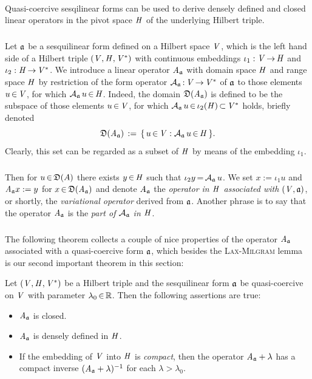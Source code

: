 \documentclass[11pt,twoside]{article}
\begin{document}
\paragraph*{} %
Quasi-coercive sesqilinear forms can be used
to derive densely defined and closed linear operators
in the pivot space $\mathit{H}$ of the underlying Hilbert triple.

\subparagraph*{}
Let $\mathfrak{a}$ be a sesquilinear form defined on a Hilbert space $\mathit{V}$,
which is the left hand side of a Hilbert triple $(\mathit{V},\mathit{H},\mathit{V}^*)$
with continuous embeddings
$\iota_1:\mathit{V} {\,\to\,} \mathit{H}$ and
$\iota_2:\mathit{H} {\,\to\,} \mathit{V}^*$.
We introduce a linear operator $\mathit{A}_{\mathfrak{a}}$ with domain space $\mathit{H}$
and range space $\mathit{H}$
by restriction of the form operator ${{\mathcal{A}}_{\mathfrak{a}}} {\,:\,} \mathit{V} {\,\to\,} \mathit{V}^*$ of $\mathfrak{a}$
to those elements $u {\,\in\,} \mathit{V}$,
for which ${{\mathcal{A}}_{\mathfrak{a}}} \, u {\,\in\,} \mathit{H}$.
Indeed,
the domain $\mathfrak{D}(\mathit{A}_{\mathfrak{a}})$ is defined to be the subspace
of those elements $u {\,\in\,} \mathit{V}$,
for which ${{\mathcal{A}}_{\mathfrak{a}}} \, u {\,\in\,} \iota_2(\mathit{H}) {\,\subset\,} \mathit{V}^*$ holds,
briefly denoted
\[
\mathfrak{D}(\mathit{A}_{\mathfrak{a}}) \,:=\, \{ \, u {\,\in\,} \mathit{V}: {{\mathcal{A}}_{\mathfrak{a}}} \, u {\,\in\,} \mathit{H} \, \}.
\]
Clearly,
this set can be regarded as a subset of $\mathit{H}$
by means of the embedding $\iota_1$.

\subparagraph*{}
Then for $u {\,\in\,} \mathfrak{D}(A)$ there exists $y {\,\in\,} \mathit{H}$
such that $\iota_2 y {\,=\,} {{\mathcal{A}}_{\mathfrak{a}}} \, u$.
We set $x := \iota_1 u$ and $\mathit{A}_{\mathfrak{a}} x := y$
for $x {\,\in\,} \mathfrak{D}(\mathit{A}_{\mathfrak{a}})$
and denote $\mathit{A}_{\mathfrak{a}}$ the \textit{operator in $\mathit{H}$
associated with $(\mathit{V},\mathfrak{a})$},
or shortly,
the \textit{variational operator} derived from $\mathfrak{a}$.
Another phrase is to say that
the operator $\mathit{A}_{\mathfrak{a}}$ is the \textit{part of ${{\mathcal{A}}_{\mathfrak{a}}}$ in $\mathit{H}$}.

\subparagraph*{} %
The following theorem collects a couple of nice properties 
of the operator $\mathit{A}_{\mathfrak{a}}$ associated with a quasi-coercive form $\mathfrak{a}$,
which besides the \textsc{Lax-Milgram} lemma
is our second important theorem in this section:

\begin{theorem}\label{QUASI-COERCIVE_FORMS_AND_ASSOCIATED_OPERATORS}
Let $(\mathit{V},\mathit{H},\mathit{V}^*)$ be a Hilbert triple
and the sesquilinear form $\mathfrak{a}$ be quasi-coercive on $\mathit{V}$
with parameter $\lambda_0 {\,\in\,} {\mathbb{R}}$.
Then the following assertions are true:

\begin{itemize}[leftmargin=12pt]
\item[1.]
$\mathit{A}_{\mathfrak{a}}$ is closed.

\item[2.]
$\mathit{A}_{\mathfrak{a}}$ is densely defined in $\mathit{H}$.

\item[3.]
If the embedding of $\mathit{V}$ into $\mathit{H}$ is \textit{compact},
then the operator $\mathit{A}_{\mathfrak{a}} + \lambda$ has a compact inverse
$(\mathit{A}_{\mathfrak{a}} +\lambda)^{-1}$ for each $\lambda > \lambda_0$.
\end{itemize}
\end{theorem}
\end{document}
